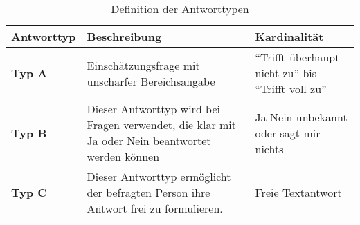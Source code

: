 \documentclass[../../main.tex]{subfiles}
\begin{document}
\begin{table}[H]
\tablefontsize	
\centering
\caption{Definition der Antworttypen}
\label{Definition der Antworttypen}
\begin{tabular}{ |p{2cm}|p{8cm}|p{5cm}|}

\hline
\tableheaderbgcolor
\textbf{Antworttyp} & \textbf{Beschreibung} & \textbf{Kardinalität}\\ 

\hline
\textbf{Typ A} &  Einschätzungsfrage mit unscharfer Bereichsangabe & "`Trifft überhaupt nicht zu"' \newline bis \newline "`Trifft voll zu"' \\

\hline
\textbf{Typ B} &  Dieser Antworttyp wird bei Fragen verwendet, die klar mit Ja oder Nein beantwortet werden können & Ja \newline Nein \newline unbekannt oder sagt mir nichts \\

\hline
\textbf{Typ C} &  Dieser Antworttyp ermöglicht der befragten Person ihre Antwort frei zu formulieren. & Freie Textantwort \\
\hline

\end{tabular}
\end{table}



\end{document}
